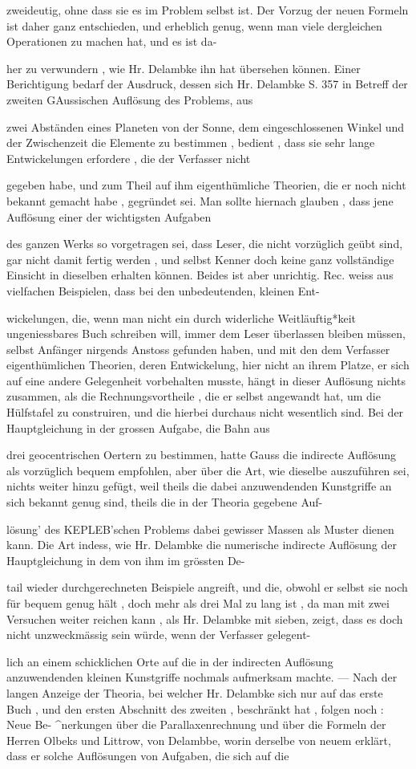 \documentclass[10pt,a4paper]{article}
\begin{document}
zweideutig, ohne dass sie es im Problem selbst ist. Der Vorzug der neuen Formeln ist daher ganz entschieden, und erheblich genug, wenn man viele dergleichen Operationen zu machen hat, und es ist da-

her zu verwundern , wie Hr. Delambke ihn hat übersehen können. Einer Berichtigung bedarf der Ausdruck, dessen sich Hr. Delambke S. 357 in Betreff der zweiten GAussischen Auflösung des Problems, aus

zwei Abständen eines Planeten von der Sonne, dem eingeschlossenen Winkel und der Zwischenzeit die Elemente zu bestimmen , bedient , dass sie sehr lange Entwickelungen erfordere , die der Verfasser nicht

gegeben habe, und zum Theil auf ihm eigenthümliche Theorien, die er noch nicht bekannt gemacht habe , gegründet sei. Man sollte hiernach glauben , dass jene Auflösung einer der wichtigsten Aufgaben

des ganzen Werks so vorgetragen sei, dass Leser, die nicht vorzüglich geübt sind, gar nicht damit fertig werden , und selbst Kenner doch keine ganz vollständige Einsicht in dieselben erhalten können. Beides ist aber unrichtig. Rec. weiss aus vielfachen Beispielen, dass bei den unbedeutenden, kleinen Ent-

wickelungen, die, wenn man nicht ein durch widerliche Weitläuftig*keit ungeniessbares Buch schreiben will, immer dem Leser überlassen bleiben müssen, selbst Anfänger nirgends Anstoss gefunden haben, und mit den dem Verfasser eigenthümlichen Theorien, deren Entwickelung, hier nicht an ihrem Platze, er sich auf eine andere Gelegenheit vorbehalten musste, hängt in dieser Auflösung nichts zusammen, als die Rechnungsvortheile , die er selbst angewandt hat, um die Hülfstafel zu construiren, und die hierbei durchaus nicht wesentlich sind. Bei der Hauptgleichung in der grossen Aufgabe, die Bahn aus

drei geocentrischen Oertern zu bestimmen, hatte Gauss die indirecte Auflösung als vorzüglich bequem empfohlen, aber über die Art, wie dieselbe auszuführen sei, nichts weiter hinzu gefügt, weil theils die dabei anzuwendenden Kunstgriffe an sich bekannt genug sind, theils die in der Theoria gegebene Auf-

lösung' des KEPLEB'schen Problems dabei gewisser Massen als Muster dienen kann. Die Art indess, wie Hr. Delambke die numerische indirecte Auflösung der Hauptgleichung in dem von ihm im grössten De-

tail wieder durchgerechneten Beispiele angreift, und die, obwohl er selbst sie noch für bequem genug hält , doch mehr als drei Mal zu lang ist , da man mit zwei Versuchen weiter reichen kann , als Hr. Delambke mit sieben, zeigt, dass es doch nicht unzweckmässig sein würde, wenn der Verfasser gelegent-

lich an einem schicklichen Orte auf die in der indirecten Auflösung anzuwendenden kleinen Kunstgriffe nochmals aufmerksam machte. — Nach der langen Anzeige der Theoria, bei welcher Hr. Delambke sich nur auf das erste Buch , und den ersten Abschnitt des zweiten , beschränkt hat , folgen noch : Neue Be- \textasciicircum{}nerkungen über die Parallaxenrechnung und über die Formeln der Herren Olbeks und Littrow, von Delambbe, worin derselbe von neuem erklärt, dass er solche Auflösungen von Aufgaben, die sich auf die
\end{document}
